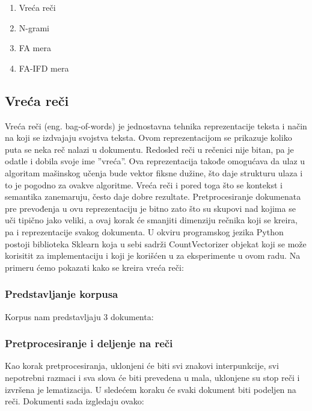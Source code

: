 \documentclass[12pt,oneside]{memoir}
\begin{document}
\begin{enumerate}
\item Vreća reči
\item N-grami 
\item FA mera
\item FA-IFD mera
\end{enumerate}

\subsection{Vreća reči}
Vreća reči (eng. bag-of-words) je jednostavna tehnika reprezentacije teksta i način na koji se izdvajaju svojstva teksta.  Ovom reprezentacijom se prikazuje koliko puta se neka reč nalazi u dokumentu.  Redosled reči u rečenici nije bitan,  pa je odatle i dobila svoje ime ”vreća”.  Ova reprezentacija takođe omogućava da ulaz u algoritam mašinskog učenja bude vektor fiksne dužine,  što daje strukturu ulaza i to je pogodno za ovakve algoritme.  Vreća reči i pored toga što se kontekst i semantika zanemaruju,  često daje dobre rezultate.  
Pretprocesiranje dokumenata pre prevođenja u ovu reprezentaciju je bitno zato što su skupovi nad kojima se uči tipično jako veliki, a ovaj korak će smanjiti dimenziju rečnika koji se kreira, pa i reprezentacije svakog dokumenta.  
U okviru programskog jezika Python postoji biblioteka Sklearn koja u sebi sadrži CountVectorizer objekat koji se može korisitit za implementaciju i koji je korišćen u za eksperimente u ovom radu. 
Na primeru ćemo pokazati kako se kreira vreća reči:

\subsubsection{Predstavljanje korpusa}
Korpus nam predstavljaju 3 dokumenta:
\newline
\newline
\noindent{}
\newline
\newline
\subsubsection{Pretprocesiranje i deljenje na reči}
Kao korak pretprocesiranja,  uklonjeni će biti svi znakovi interpunkcije,  svi nepotrebni razmaci i sva slova će biti prevedena u mala,  uklonjene su stop reči i izvršena je lematizacija. U sledećem koraku će svaki dokument biti podeljen na reči.  Dokumenti sada izgledaju ovako:
\newline
\newline
\noindent{}
\newline
\end{document}
